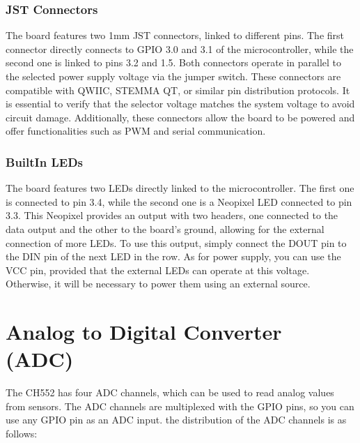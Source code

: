 \documentclass[letterpaper,10pt,english]{sphinxmanual}
\begin{document}
\subsection{JST Connectors}
\label{\detokenize{generalboardcontrol:jst-connectors}}
\sphinxAtStartPar
The board features two 1mm JST connectors, linked to different pins. The first connector directly connects to GPIO 3.0 and 3.1 of the microcontroller, while the second one is linked to pins 3.2 and 1.5. Both connectors operate in parallel to the selected power supply voltage via the jumper switch. These connectors are compatible with QWIIC, STEMMA QT, or similar pin distribution protocols. It is essential to verify that the selector voltage matches the system voltage to avoid circuit damage. Additionally, these connectors allow the board to be powered and offer functionalities such as PWM and serial communication.



\subsection{Built\sphinxhyphen{}In LEDs}
\label{\detokenize{generalboardcontrol:built-in-leds}}
\sphinxAtStartPar
The board features two LEDs directly linked to the microcontroller. The first one is connected to pin 3.4, while the second one is a Neopixel LED connected to pin 3.3. This Neopixel provides an output with two headers, one connected to the data output and the other to the board’s ground, allowing for the external connection of more LEDs. To use this output, simply connect the DOUT pin to the DIN pin of the next LED in the row. As for power supply, you can use the VCC pin, provided that the external LEDs can operate at this voltage. Otherwise, it will be necessary to power them using an external source.


\sphinxstepscope


\chapter{Analog to Digital Converter (ADC)}
\label{\detokenize{adc:analog-to-digital-converter-adc}}\label{\detokenize{adc::doc}}
\sphinxAtStartPar
The CH552 has four ADC channels, which can be used to read analog values from sensors. The ADC channels are multiplexed with the GPIO pins, so you can use any GPIO pin as an ADC input.
the distribution of the ADC channels is as follows:
\end{document}
